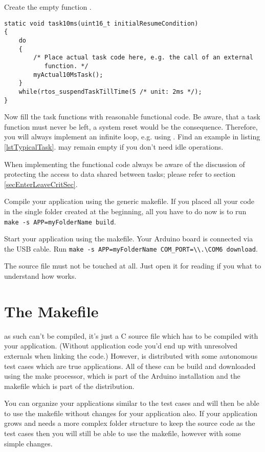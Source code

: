Create the empty function .

\begin{lstlisting}[float, caption={Typical task, regularly activated},
label=lstTypicalTask, captionpos=b]
static void task10ms(uint16_t initialResumeCondition)
{
    do
    {
        /* Place actual task code here, e.g. the call of an external
           function. */
        myActual10MsTask();
    }
    while(rtos_suspendTaskTillTime(5 /* unit: 2ms */);
}
\end{lstlisting}


Now fill the task functions with reasonable functional code. Be aware,
that a task function must never be left, a system reset would be the
consequence. Therefore, you will always implement an infinite loop, e.g.
using . Find an example in listing
\ref{lstTypicalTask}.  may remain empty if you don't need idle
operations.

When implementing the functional code always be aware of the discussion of
protecting the access to data shared between tasks; please refer to
section \ref{secEnterLeaveCritSec}.

Compile your application using the generic makefile. If you placed all
your code in the single folder created at the beginning, all you have to
do now is to run \verb+make -s APP=myFolderName build+.

Start your application using the makefile. Your Arduino board is connected
via the USB cable. Run 
\verb+make -s APP=myFolderName COM_PORT=\\.\COM6 download+.

The \rtos{} source file  must not be touched at all. Just open
it for reading if you what to understand how \rtos{} works.


\section{The Makefile}

\rtos{} as such can't be compiled, it's just a C source file which has to
be compiled with your application. (Without application code you'd end up
with unresolved externals when linking the code.) However, \rtos{} is
distributed with some autonomous test cases which are true \rtos{}
applications. All of these can be build and downloaded using the make
processor, which is part of the Arduino installation and the makefile
which is part of the \rtos{} distribution.

You can organize your applications similar to the test cases and will then
be able to use the makefile without changes for your application also. If
your application grows and needs a more complex folder structure to keep
the source code as the test cases then you will still be able to use the
makefile, however with some simple changes.

